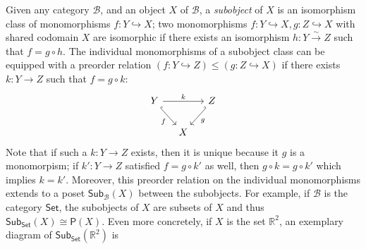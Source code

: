 \documentclass[10pt]{article}
\theoremstyle{definition}
\theoremstyle{remark}
\newcommand{\set}{\mathsf{Set}} %
\newcommand{\sub}{\mathsf{Sub}} %
\newcommand{\pow}{\mathsf{P}} %
\newcommand{\catB}{\mathcal{B}}
\begin{document}
Given any category $\catB$, and an object $X$ of $\catB$, a \textit{subobject} of $X$ is an isomorphism class of monomorphisms $f : Y \hookrightarrow X$; two monomorphisms $f : Y \hookrightarrow X, g : Z \hookrightarrow
X$ with shared codomain $X$ are isomorphic if there exists an isomorphism $h : Y \xrightarrow{\sim} Z$ such that $f = g \circ h$. The individual monomorphisms of a subobject class can be equipped with a preorder relation $( f : Y \hookrightarrow Z ) \leq ( g : Z \hookrightarrow X )$ if there exists $k : Y \rightarrow Z$ such that $f = g \circ k$:
\begin{equation}
    \begin{tikzcd}[column sep=small]
        Y \ar[rd, hook, "f"'] \ar[rr, "k"] &   & Z \ar[ld, hook', "g"]\\
          & X & 
    \end{tikzcd}
\end{equation}
Note that if such a $k : Y \to Z$ exists, then it is unique because it $g$ is a monomorpism; if $k' : Y \rightarrow Z$ satisfied $f = g \circ k'$ as well, then $g \circ k = g \circ k'$ which implies $k = k'$. Moreover, this preorder relation on the individual monomorphisms extends to a poset $\sub_{\catB}(X)$ between the subobjects. For example, if $\catB$ is the category $\set$, the subobjects of $X$ are subsets of $X$ and thus $\sub_{\set}(X) \cong \pow(X)$. Even more concretely, if $X$ is the set $\mathbb{R}^2$, an exemplary diagram of $\sub_{\set}(\mathbb{R}^2)$ is
\end{document}
